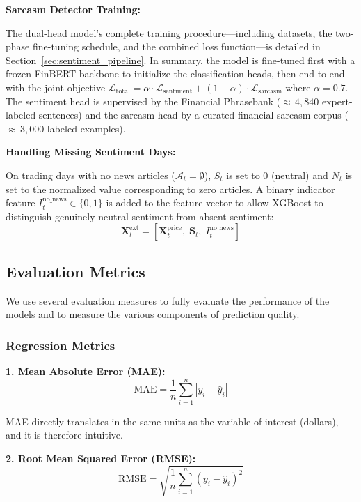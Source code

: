 \textbf{Sarcasm Detector Training:}

The dual-head model's complete training procedure---including datasets, the two-phase fine-tuning schedule, and the combined loss function---is detailed in Section~\ref{sec:sentiment_pipeline}. In summary, the model is fine-tuned first with a frozen FinBERT backbone to initialize the classification heads, then end-to-end with the joint objective $\mathcal{L}_{\text{total}} = \alpha \cdot \mathcal{L}_{\text{sentiment}} + (1 - \alpha) \cdot \mathcal{L}_{\text{sarcasm}}$ where $\alpha = 0.7$. The sentiment head is supervised by the Financial Phrasebank (${\approx}\,4{,}840$ expert-labeled sentences) and the sarcasm head by a curated financial sarcasm corpus (${\approx}\,3{,}000$ labeled examples).

\textbf{Handling Missing Sentiment Days:}

On trading days with no news articles ($\mathcal{A}_t = \emptyset$), $S_t$ is set to 0 (neutral) and $N_t$ is set to the normalized value corresponding to zero articles. A binary indicator feature $I_t^{\text{no\_news}} \in \{0, 1\}$ is added to the feature vector to allow XGBoost to distinguish genuinely neutral sentiment from absent sentiment:
\begin{equation}
\mathbf{X}_t^{\text{ext}} = \left[\mathbf{X}_t^{\text{price}},\; \mathbf{S}_t,\; I_t^{\text{no\_news}}\right]
\end{equation}

\subsection{Evaluation Metrics}

We use several evaluation measures to fully evaluate the performance of the models and to measure the various components of prediction quality.

\subsubsection{Regression Metrics}

\textbf{1. Mean Absolute Error (MAE):}
\begin{equation}
\text{MAE} = \frac{1}{n} \sum_{i=1}^{n} |y_i - \hat{y}_i|
\end{equation}

MAE directly translates in the same units as the variable of interest (dollars), and it is therefore intuitive.

\textbf{2. Root Mean Squared Error (RMSE):}
\begin{equation}
\text{RMSE} = \sqrt{\frac{1}{n} \sum_{i=1}^{n} (y_i - \hat{y}_i)^2}
\end{equation}

